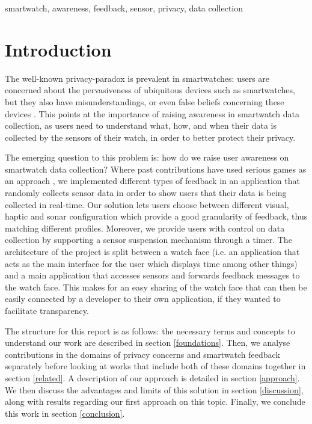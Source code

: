 \documentclass[conference, a4paper, 10pt, twocolumn]{IEEEtran}
\begin{document}
\begin{IEEEkeywords}
smartwatch, awareness, feedback, sensor, privacy, data collection
\end{IEEEkeywords}

\section{\textbf{Introduction}}
The well-known privacy-paradox \cite{williams2019smart,patil2015interrupt} is prevalent in smartwatches: users are concerned about the pervasiveness of ubiquitous devices such as smartwatches, but they also have misunderstandings, or even false beliefs concerning these devices \cite{udoh2016privacy}. This points at the importance of raising awareness in smartwatch data collection, as users need to understand what, how, and when their data is collected by the sensors of their watch, in order to better protect their privacy. 

The emerging question to this problem is: how do we raise user awareness on smartwatch data collection? Where past contributions have used serious games as an approach \cite{williams2019smart}, we implemented different types of feedback in an application that randomly collects sensor data in order to show users that their data is being collected in real-time. Our solution lets users choose between different visual, haptic and sonar configuration which provide a good granularity of feedback, thus matching different profiles. Moreover, we provide users with control on data collection by supporting a sensor suspension mechanism through a timer. The architecture of the project is split between a watch face (i.e. an application that acts as the main interface for the user which displays time among other things) and a main application that accesses sensors and forwards feedback messages to the watch face. This makes for an easy sharing of the watch face that can then be easily connected by a developer to their own application, if they wanted to facilitate transparency.

The structure for this report is as follows: the necessary terms and concepts to understand our work are described in section \ref{foundations}. Then, we analyse contributions in the domains of privacy concerns and smartwatch feedback separately before looking at works that include both of these domains together in section \ref{related}. A description of our approach is detailed in section \ref{approach}. We then discuss the advantages and limits of this solution in section \ref{discussion}, along with results regarding our first approach on this topic. Finally, we conclude this work in section \ref{conclusion}.   
\end{document}
